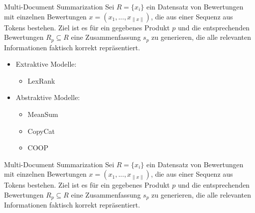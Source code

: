 

\begin{frame}{Multi-Document Summarization}
  Sei $R= \{x_i \}$ ein Datensatz von Bewertungen mit einzelnen Bewertungen $x=(x_1,...,x_{\| x \|})$, die aus einer Sequenz aus Tokens bestehen.
Ziel ist es für ein gegebenes Produkt $p$ und die entsprechenden Bewertungen $R_p \subseteq R$ eine Zusammenfassung $s_p$ zu generieren, die alle relevanten Informationen faktisch korrekt repräsentiert.
\begin{itemize}   
  \item Extraktive Modelle: \begin{itemize}
    \item LexRank
  \end{itemize}
  \item Abstraktive Modelle: \begin{itemize}
    \item MeanSum
    \item CopyCat
    \item COOP
  \end{itemize}
\end{itemize}
\end{frame}

\begin{frame}{Multi-Document Summarization}
  Sei $R= \{x_i \}$ ein Datensatz von Bewertungen mit einzelnen Bewertungen $x=(x_1,...,x_{\| x \|})$, die aus einer Sequenz aus Tokens bestehen.
Ziel ist es für ein gegebenes Produkt $p$ und die entsprechenden Bewertungen $R_p \subseteq R$ eine Zusammenfassung $s_p$ zu generieren, die alle relevanten Informationen faktisch korrekt repräsentiert.
\end{frame}


